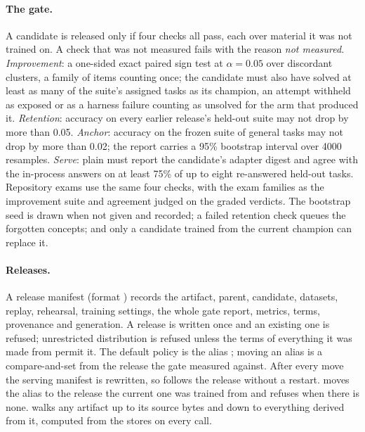 \paragraph{The gate.} A candidate is released only if four checks all pass, each over
material it was not trained on. A check that was not measured fails with the
reason \emph{not measured}.
\emph{Improvement}: a one-sided exact paired sign test at $\alpha=0.05$ over discordant
clusters, a family of items counting once; the candidate must also have solved at least as
many of the suite's assigned tasks as its champion, an attempt withheld as exposed or as a
harness failure counting as unsolved for the arm that produced it.
\emph{Retention}: accuracy on every earlier release's held-out suite may not drop by more
than 0.05.
\emph{Anchor}: accuracy on the frozen suite of general tasks may not drop by more than
0.02; the report carries a 95\% bootstrap interval over 4000 resamples.
\emph{Serve}: plain  must report the candidate's adapter digest and
agree with the in-process answers on at least 75\% of up to eight re-answered held-out
tasks. Repository exams use the same four checks, with the exam families as the
improvement suite and agreement judged on the graded verdicts. The bootstrap seed
is drawn when not given and recorded; a failed retention check queues the
forgotten concepts; and only a candidate trained from the current champion can
replace it.

\paragraph{Releases.} A release manifest (format ) records the
artifact, parent, candidate, datasets, replay, rehearsal, training settings, the whole
gate report, metrics, terms, provenance and generation. A release is written
once and an existing one is refused; unrestricted distribution is refused unless
the terms of everything it was made from permit it. The default policy is the alias
; moving an alias is a compare-and-set from the release the gate
measured against. After every move the serving manifest
 is rewritten, so 
follows the release without a restart.  moves the alias to
the release the current one was trained from and refuses when there is none.
 walks any artifact up to its source bytes and down to everything
derived from it, computed from the stores on every call.
